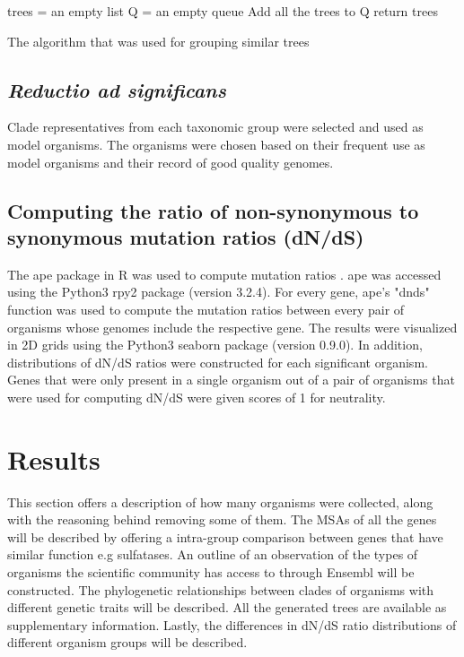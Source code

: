 \documentclass{article}
\begin{document}
\begin{algorithm}[h!]
\SetAlgoLined
{}
trees = an empty list\;
Q = an empty queue\;
Add all the trees to Q\;
return trees\;
\caption{The algorithm that was used for grouping similar trees}
\label{alg_1}
\end{algorithm}

\subsection*{\textit{Reductio ad significans}}
Clade representatives from each taxonomic group were selected and used as model organisms. The organisms were chosen based on their frequent use as model organisms and their record of good quality genomes.

\subsection*{Computing the ratio of non-synonymous to synonymous mutation ratios (dN/dS)}
The ape package in R was used to compute mutation ratios \cite{ape}. ape was accessed using the Python3 rpy2 package (version 3.2.4). For every gene, ape's "dnds" function was used to compute the mutation ratios between every pair of organisms whose genomes include the respective gene. The results were visualized in 2D grids using the Python3 seaborn package (version 0.9.0). In addition, distributions of dN/dS ratios were constructed for each significant organism. Genes that were only present in a single organism out of a pair of organisms that were used for computing dN/dS were given scores of 1 for neutrality.

\section*{Results}
This section offers a description of how many organisms were collected, along with the reasoning behind removing some of them. The MSAs of all the genes will be described by offering a intra-group comparison between genes that have similar function e.g sulfatases. An outline of an observation of the types of organisms the scientific community has access to through Ensembl will be constructed. The phylogenetic relationships between clades of organisms with different genetic traits will be described. All the generated trees are available as supplementary information. Lastly, the differences in dN/dS ratio distributions of different organism groups will be described. 
\end{document}
